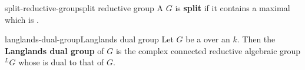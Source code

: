 \begin{topic}{split-reductive-group}{split reductive group}
    A  $G$ is \textbf{split} if it contains a maximal  which is .
\end{topic}

\begin{topic}{langlands-dual-group}{Langlands dual group}
    Let $G$ be a    over an  $k$. Then the \textbf{Langlands dual group} of $G$ is the complex connected reductive algebraic group $^L G$ whose  is dual to that of $G$.
\end{topic}


